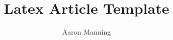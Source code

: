 \documentclass[titlepage, 12pt, a4paper]{article}
\title{Latex Article Template}
\author{Aaron Manning}
\date{}
\begin{document}
    \maketitle
    \tableofcontents

    \allowdisplaybreaks

    \raggedright

    \raggedbottom


    
\end{document}
